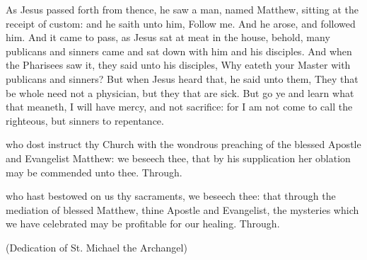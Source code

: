 
 As Jesus passed forth from thence, he saw a man, named Matthew, sitting at the receipt of custom: and he saith unto him, Follow me. And he arose, and followed him. And it came to pass, as Jesus sat at meat in the house, behold, many publicans and sinners came and sat down with him and his disciples. And when the Pharisees saw it, they said unto his disciples, Why eateth your Master with publicans and sinners? But when Jesus heard that, he said unto them, They that be whole need not a physician, but they that are sick. But go ye and learn what that meaneth, I will have mercy, and not sacrifice: for I am not come to call the righteous, but sinners to repentance.


\secret
{} who dost instruct thy Church with the wondrous preaching of the blessed Apostle and Evangelist Matthew: we beseech thee, that by his supplication her oblation may be commended unto thee. Through.


\postcommunion
{} who hast bestowed on us thy sacraments, we beseech thee: that through the mediation of blessed Matthew, thine Apostle and Evangelist, the mysteries which we have celebrated may be profitable for our healing. Through.


%
  
{}

\centerline{\small{(Dedication of St. Michael the Archangel)}}

